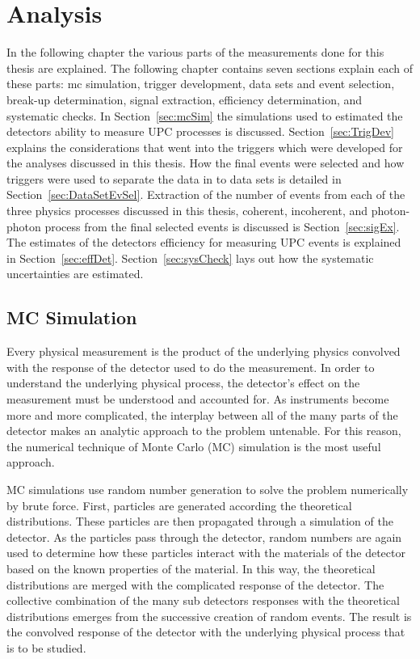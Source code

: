 \chapter{Analysis}
  In the following chapter the various parts of the measurements done for this
    thesis are explained. 
  The following chapter contains seven sections explain each of these parts: 
    mc simulation, trigger development, data sets and event selection,
    break-up determination, signal extraction, efficiency determination,
    and systematic checks. 
  In Section~\ref{sec:mcSim} the simulations used to estimated the detectors 
    ability to measure UPC processes is discussed. 
  Section~\ref{sec:TrigDev} explains the considerations that went into the 
    triggers which were developed for the analyses discussed in this thesis.
  How the final events were selected and how triggers were used to separate the
    data in to data sets is detailed in Section~\ref{sec:DataSetEvSel}.
  Extraction of the number of events from each of the three physics processes 
    discussed in this thesis, coherent, incoherent, and photon-photon process
    from the final selected events is discussed is Section~\ref{sec:sigEx}.
  The estimates of the detectors efficiency for measuring UPC events is 
    explained in Section~\ref{sec:effDet}.
  Section~\ref{sec:sysCheck} lays out how the systematic uncertainties are 
    estimated.

  \section{\label{sec:mcSim} MC Simulation}
    Every physical measurement is the product of the underlying physics 
      convolved with the response of the detector used to do the measurement. 
    In order to understand the underlying physical process, the detector's 
      effect on the measurement must be understood and accounted for. 
    As instruments become more and more complicated, the interplay between all
      of the many parts of the detector makes an analytic approach to the 
      problem untenable.
    For this reason, the numerical technique of Monte Carlo (MC) simulation is
      the most useful approach.

    MC simulations use random number generation to solve the problem 
      numerically by brute force. 
    First, particles are generated according the theoretical distributions.
    These particles are then propagated through a simulation of the detector.
    As the particles pass through the detector, random numbers are again used
      to determine how these particles interact with the materials of the 
      detector based on the known properties of the material. 
    In this way, the theoretical distributions are merged with the complicated 
      response of the detector. 
    The collective combination of the many sub detectors responses with the 
      theoretical distributions emerges from the successive creation of random
      events.
    The result is the convolved response of the detector with the underlying 
      physical process that is to be studied. 

